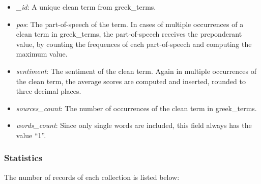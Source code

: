 \begin{itemize}
 \item \emph{\_id}: A unique clean term from greek\_terms.
 
 \item \emph{pos}: The part-of-speech of the term.
 In cases of multiple occurrences of a clean term in greek\_terms,
 the part-of-speech receives the preponderant value,
 by counting the frequences of each part-of-speech
 and computing the maximum value.
 
 \item \emph{sentiment}: The sentiment of the clean term.
 Again in multiple occurrences of the clean term,
 the average scores are computed and inserted,
 rounded to three decimal places.
 
 \item \emph{sources\_count}: The number of occurrences
 of the clean term in greek\_terms.
 
 \item \emph{words\_count}: Since only single words are included,
 this field always has the value ``1''.
\end{itemize}

\subsubsection{Statistics}
\label{subsubsec:statistics}

The number of records of each collection is listed below:

